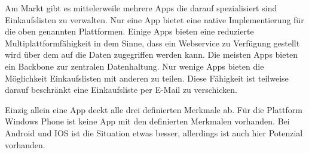 \documentclass[10pt, conference, compsocconf]{IEEEtran}
\begin{document}
Am Markt gibt es mittelerweile mehrere Apps die darauf spezialisiert sind Einkaufslisten zu verwalten.
Nur eine App bietet eine native Implementierung f\"ur die oben genannten Plattformen. Einige Apps bieten eine reduzierte Multiplattformf\"ahigkeit in dem Sinne, dass ein Webservice zu Verf\"ugung gestellt wird \"uber dem auf die Daten zugegriffen werden kann.
Die meisten Apps bieten ein Backbone zur zentralen Datenhaltung.
Nur wenige Apps bieten die M\"oglichkeit Einkaufslisten mit anderen zu teilen. Diese F\"ahigkeit ist teilweise darauf beschr\"ankt eine Einkaufsliste per E-Mail zu 
verschicken.

Einzig allein eine App deckt alle drei definierten Merkmale ab. 
F\"ur die Plattform Windows Phone ist keine App mit den definierten Merkmalen vorhanden.
Bei Android und IOS ist die Situation etwas besser, allerdings ist auch hier Potenzial vorhanden.
\end{document}
